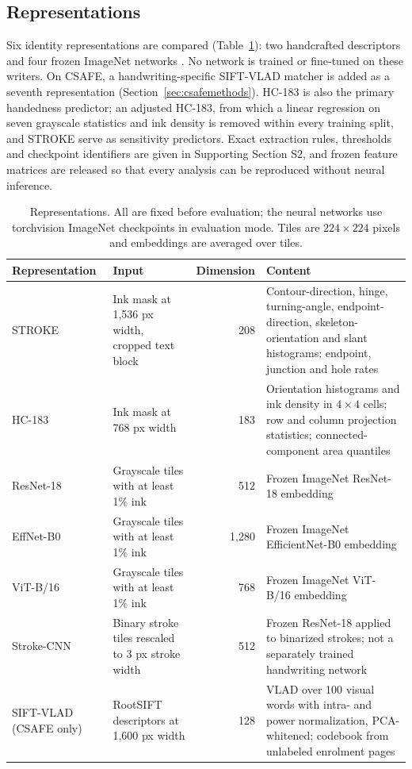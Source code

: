 \documentclass[ASNA,twocolumn]{USG}
\begin{document}
\subsection{Representations}
Six identity representations are compared (Table~\ref{tab:representations}): two handcrafted descriptors and four frozen ImageNet networks \cite{he2016resnet,tan2019efficientnet,dosovitskiy2021vit}. No network is trained or fine-tuned on these writers. On CSAFE, a handwriting-specific SIFT-VLAD matcher is added as a seventh representation (Section~\ref{sec:csafemethods}). HC-183 is also the primary handedness predictor; an adjusted HC-183, from which a linear regression on seven grayscale statistics and ink density is removed within every training split, and STROKE serve as sensitivity predictors. Exact extraction rules, thresholds and checkpoint identifiers are given in Supporting Section S2, and frozen feature matrices are released so that every analysis can be reproduced without neural inference.

\begin{table}[!t]
\caption{Representations. All are fixed before evaluation; the neural networks use torchvision ImageNet checkpoints in evaluation mode. Tiles are $224\times224$ pixels and embeddings are averaged over tiles.}\label{tab:representations}
\centering
\begin{tabularx}{\textwidth}{@{}>{\raggedright\arraybackslash}p{}>{\raggedright\arraybackslash}p{}r>{\raggedright\arraybackslash}X@{}}\toprule
Representation & Input & Dimension & Content\\\midrule
STROKE & Ink mask at 1,536 px width, cropped text block & 208 & Contour-direction, hinge, turning-angle, endpoint-direction, skeleton-orientation and slant histograms; endpoint, junction and hole rates\\
HC-183 & Ink mask at 768 px width & 183 & Orientation histograms and ink density in $4\times4$ cells; row and column projection statistics; connected-component area quantiles\\
ResNet-18 & Grayscale tiles with at least 1\% ink & 512 & Frozen ImageNet ResNet-18 embedding\\
EffNet-B0 & Grayscale tiles with at least 1\% ink & 1,280 & Frozen ImageNet EfficientNet-B0 embedding\\
ViT-B/16 & Grayscale tiles with at least 1\% ink & 768 & Frozen ImageNet ViT-B/16 embedding\\
Stroke-CNN & Binary stroke tiles rescaled to 3 px stroke width & 512 & Frozen ResNet-18 applied to binarized strokes; not a separately trained handwriting network\\
SIFT-VLAD (CSAFE only) & RootSIFT descriptors at 1,600 px width & 128 & VLAD over 100 visual words with intra- and power normalization, PCA-whitened; codebook from unlabeled enrolment pages\\\bottomrule
\end{tabularx}
\end{table}
\end{document}
